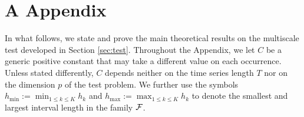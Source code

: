 \documentclass[a4paper,12pt]{article}
\numberwithin{equation}{section}
\begin{document}



\newpage



\section*{A \hspace{0.2cm} Appendix}
\def\theequation{A.\arabic{equation}}
\setcounter{equation}{0}

\enlargethispage{0.1cm}


In what follows, we state and prove the main theoretical results on the multiscale test developed in Section \ref{sec:test}. Throughout the Appendix, we let $C$ be a generic positive constant that may take a different value on each occurrence. Unless stated differently, $C$ depends neither on the time series length $T$ nor on the dimension $p$ of the test problem. We further use the symbols $h_{\min}:= \min_{1 \le k \le K} h_k$ and $h_{\max} := \max_{1 \le k \le K} h_k$ to denote the smallest and largest interval length in the family $\mathcal{F}$. 
\end{document}
